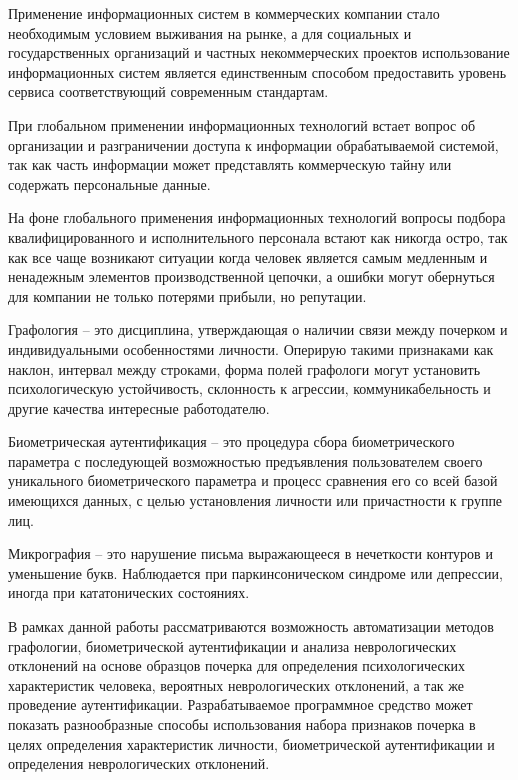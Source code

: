 \label{sec:intro}

Применение информационных систем в коммерческих компании стало необходимым условием выживания на рынке, а для социальных и государственных организаций и частных некоммерческих проектов использование информационных систем является единственным способом предоставить уровень сервиса соответствующий современным стандартам. 

При глобальном применении информационных технологий встает вопрос об организации и разграничении доступа к информации обрабатываемой системой, так как часть информации может представлять коммерческую тайну или содержать персональные данные.

На фоне глобального применения информационных технологий вопросы подбора квалифицированного и исполнительного персонала встают как никогда остро, так как все чаще возникают ситуации когда человек является самым медленным и ненадежным элементов производственной цепочки, а ошибки могут обернуться для компании не только потерями прибыли, но репутации.

Графология -- это дисциплина, утверждающая о наличии связи между почерком и индивидуальными особенностями личности. Оперирую такими признаками как наклон, интервал между строками, форма полей графологи могут установить психологическую устойчивость, склонность к агрессии, коммуникабельность и другие качества интересные работодателю.

Биометрическая аутентификация -- это процедура сбора биометрического параметра с последующей возможностью предъявления пользователем своего уникального биометрического параметра и процесс сравнения его со всей базой имеющихся данных, с целью установления личности или причастности к группе лиц.

Микрография -- это нарушение письма выражающееся в нечеткости контуров и уменьшение букв. Наблюдается при паркинсоническом синдроме или депрессии, иногда при кататонических состояниях.

В рамках данной работы рассматриваются возможность автоматизации методов графологии, биометрической аутентификации и анализа неврологических отклонений на основе образцов почерка для определения психологических характеристик человека, вероятных неврологических отклонений, а так же проведение аутентификации.
Разрабатываемое программное средство может показать разнообразные способы использования набора признаков почерка в целях определения характеристик личности, биометрической аутентификации и определения неврологических отклонений.